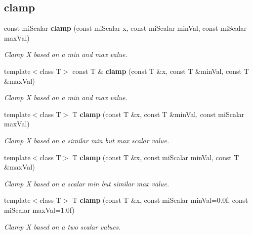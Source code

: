 \subsection*{clamp}
\begin{CompactItemize}
\item 
const mi\-Scalar {\bf clamp} (const mi\-Scalar x, const mi\-Scalar min\-Val, const mi\-Scalar max\-Val)
\begin{CompactList}\small\item\em Clamp X based on a min and max value. \item\end{CompactList}\item 
template$<$class T$>$ const T \& {\bf clamp} (const T \&x, const T \&min\-Val, const T \&max\-Val)
\begin{CompactList}\small\item\em Clamp X based on a min and max value. \item\end{CompactList}\item 
template$<$class T$>$ T {\bf clamp} (const T \&x, const T \&min\-Val, const mi\-Scalar max\-Val)
\begin{CompactList}\small\item\em Clamp X based on a similar min but max scalar value. \item\end{CompactList}\item 
template$<$class T$>$ T {\bf clamp} (const T \&x, const mi\-Scalar min\-Val, const T \&max\-Val)
\begin{CompactList}\small\item\em Clamp X based on a scalar min but similar max value. \item\end{CompactList}\item 
template$<$class T$>$ T {\bf clamp} (const T \&x, const mi\-Scalar min\-Val=0.0f, const mi\-Scalar max\-Val=1.0f)
\begin{CompactList}\small\item\em Clamp X based on a two scalar values. \item\end{CompactList}\end{CompactItemize}
